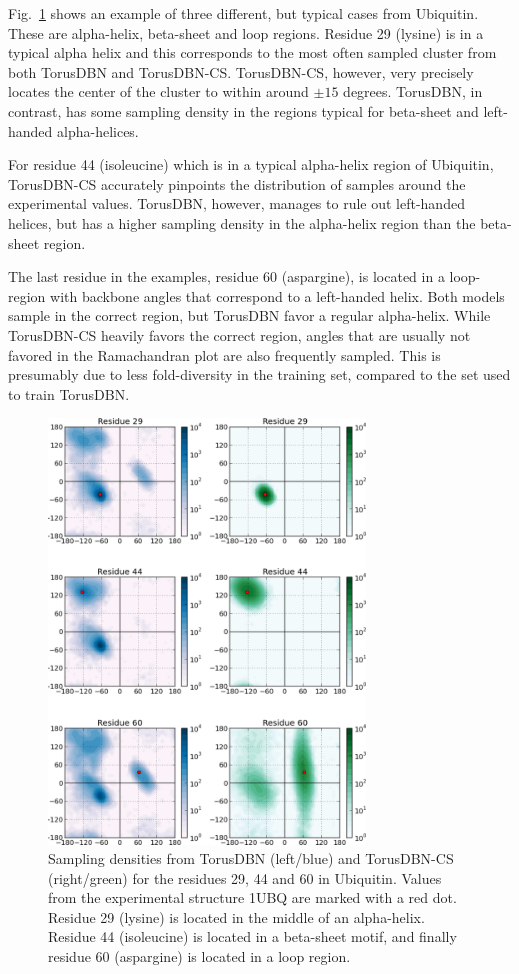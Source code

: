 Fig.~\ref{fig:torus} shows an example of three different, but typical cases from Ubiquitin. These are alpha-helix, beta-sheet and loop regions.
Residue 29 (lysine) is in a typical alpha helix and this corresponds to the most often sampled cluster from both TorusDBN and TorusDBN-CS. TorusDBN-CS, however, very precisely locates the center of the cluster to within around $\pm 15$ degrees. TorusDBN, in contrast, has some sampling density in the regions typical for beta-sheet and left-handed alpha-helices.

For residue 44 (isoleucine) which is in a typical alpha-helix region of Ubiquitin, TorusDBN-CS accurately pinpoints the distribution of samples around the experimental values.
TorusDBN, however, manages to rule out left-handed helices, but has a higher sampling density in the alpha-helix region than the beta-sheet region. 

The last residue in the examples, residue 60 (aspargine), is located in a loop-region with backbone angles that correspond to a left-handed helix.
Both models sample in the correct region, but TorusDBN favor a regular alpha-helix.
While TorusDBN-CS heavily favors the correct region, angles that are usually not favored in the Ramachandran plot are also frequently sampled.
This is presumably due to less fold-diversity in the training set, compared to the set used to train TorusDBN.

\begin{figure}
    \centering
    \includegraphics[width=0.75\textwidth]{figures/torus_versions.pdf}
    \caption{Sampling densities from TorusDBN (left/blue) and TorusDBN-CS (right/green) for the residues 29, 44 and 60 in Ubiquitin. Values from the experimental structure 1UBQ are marked with a red dot. Residue 29 (lysine) is located in the middle of an alpha-helix. Residue 44 (isoleucine) is located in a beta-sheet motif, and finally residue 60 (aspargine) is located in a loop region.}
    \label{fig:torus}
\end{figure}


